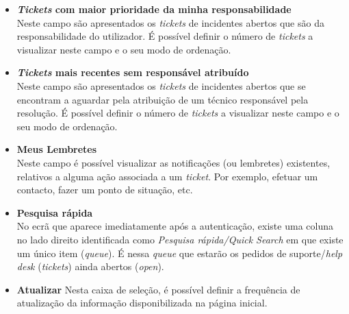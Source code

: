 \begin{itemize}
\item \textbf{\textit{Tickets} com maior prioridade da minha responsabilidade} \\
Neste campo são apresentados os \textit{tickets} de incidentes abertos que são da responsabilidade do utilizador.
É possível definir o número de \textit{tickets} a visualizar neste campo e o seu modo de ordenação.

\item \textbf{\textit{Tickets} mais recentes sem responsável atribuído} \\
Neste campo são apresentados os \textit{tickets} de incidentes abertos que se encontram a aguardar pela atribuição de um técnico responsável pela resolução.
É possível definir o número de \textit{tickets} a visualizar neste campo e o seu modo de ordenação.

\item \textbf{Meus Lembretes} \\
Neste campo é possível visualizar as notificações (ou lembretes) existentes, relativos a alguma ação associada a um \textit{ticket}. Por exemplo, efetuar um contacto, fazer um ponto de situação, etc.

\item \textbf{Pesquisa rápida} \\
No ecrã que aparece imediatamente após a autenticação, existe uma coluna no lado direito identificada como \emph{Pesquisa rápida/\textit{Quick Search}} em que existe um único item (\emph{queue}).
É nessa \emph{queue} que estarão os pedidos de suporte/\textit{help desk} (\emph{tickets}) ainda abertos (\textit{open}).

\item \textbf{Atualizar}
Nesta caixa de seleção, é possível definir a frequência de atualização da informação disponibilizada na página inicial.
\end{itemize}



